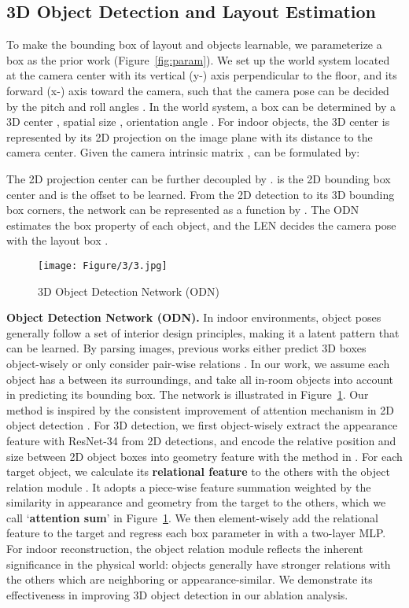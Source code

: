 \documentclass[10pt,twocolumn,letterpaper]{article}
\begin{document}
\subsection{3D Object Detection and Layout Estimation}
\label{sec:3DD}
To make the bounding box of layout and objects learnable, we parameterize a box as the prior work \cite{huang2018cooperative} (Figure~\ref{fig:param}). We set up the world system located at the camera center with its vertical (y-) axis perpendicular to the floor, and its forward (x-) axis toward the camera, such that the camera pose  can be decided by the pitch and roll angles .
In the world system, a box can be determined by a 3D center , spatial size , orientation angle . For indoor objects, the 3D center  is represented by its 2D projection  on the image plane with its distance  to the camera center. Given the camera intrinsic matrix ,  can be formulated by:

The 2D projection center  can be further decoupled by .  is the 2D bounding box center and  is the offset to be learned. From the 2D detection  to its 3D bounding box corners, the network can be represented as a function by . The ODN estimates the box property  of each object, and the LEN decides the camera pose  with the layout box .

\begin{figure}[!ht]
	\centering
	\texttt{[image: Figure/3/3.jpg]}
	\caption{3D Object Detection Network (ODN)}
	\label{fig:ODN}
\end{figure}

\noindent\textbf{Object Detection Network (ODN).} In indoor environments, object poses generally follow a set of interior design principles, making it a latent pattern that can be learned. By parsing images, previous works either predict 3D boxes object-wisely \cite{huang2018cooperative,tulsiani2018factoring} or only consider pair-wise relations \cite{kulkarni20193d}. In our work, we assume each object has a  between its surroundings, and take all in-room objects into account in predicting its bounding box. The network is illustrated in Figure~\ref{fig:ODN}. Our method is inspired by the consistent improvement of attention mechanism in 2D object detection \cite{hu2018relation}. For 3D detection, we first object-wisely extract the appearance feature with ResNet-34 \cite{he2016deep} from 2D detections, and encode the relative position and size between 2D object boxes into geometry feature with the method in \cite{hu2018relation,vaswani2017attention}. For each target object, we calculate its \textbf{relational feature} to the others with the object relation module \cite{hu2018relation}. It adopts a piece-wise feature summation weighted by the similarity in appearance and geometry from the target to the others, which we call `\textbf{attention sum}' in Figure~\ref{fig:ODN}. We then element-wisely add the relational feature to the target and regress each box parameter in  with a two-layer MLP. For indoor reconstruction, the object relation module reflects the inherent significance in the physical world: objects generally have stronger relations with the others which are neighboring or appearance-similar. We demonstrate its effectiveness in improving 3D object detection in our ablation analysis.
\end{document}
